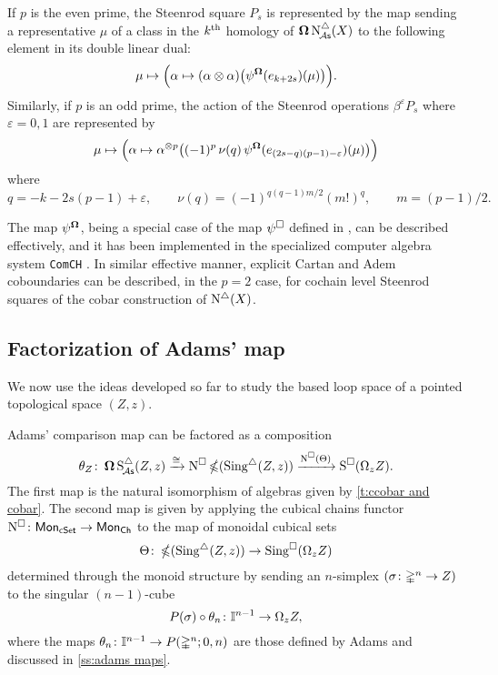 If $p$ is the even prime, the Steenrod square $P_s$ is represented by the map sending a representative $\mu$ of a class in the $k^{\mathrm{th}}$ homology of $\operatorname{\mathbf{\Omega}} \operatorname{N^{\triangle}_{\!{\mathcal{A}\mathsf{s}}}}(X)$ to the following element in its double linear dual:
\[
\mu \mapsto
\Big( \alpha \mapsto (\alpha \otimes \alpha) \big( \psi^{\operatorname{\mathbf{\Omega}}}(e_{k+2s})(\mu) \big) \Big).
\]
Similarly, if $p$ is an odd prime, the action of the Steenrod operations $\beta^\varepsilon P_{s}$ where $\varepsilon = 0,1$ are represented by
\[
\mu \mapsto
\Big( \alpha \mapsto \alpha^{\otimes p} \big( (-1)^p \, \nu(q) \, \psi^{\operatorname{\mathbf{\Omega}}}(e_{(2s-q)(p-1)-\varepsilon})(\mu) \big) \Big)
\]
where
\[
q = -k -2s(p-1) + \varepsilon, \qquad
\nu(q) = (-1)^{q(q-1)m/2}(m!)^q, \qquad
m = (p-1)/2.
\]

The map $\psi^{\operatorname{\mathbf{\Omega}}}$, being a special case of the map $\psi^\square$ defined in \cite{medina2021may_st}, can be described effectively, and it has been implemented in the specialized computer algebra system \texttt{ComCH} \cite{medina2021comch}.
In similar effective manner, explicit Cartan and Adem coboundaries \cite{medina2020cartan, medina2021adem} can be described, in the $p = 2$ case, for cochain level Steenrod squares of the cobar construction of $\operatorname{N^{\triangle}}(X)$.

\subsection{Factorization of Adams' map}\label{ss:factorization of adams}

We now use the ideas developed so far to study the based loop space of a pointed topological space $(Z,z)$.

Adams' comparison map can be factored as a composition
\begin{equation}\label{e:factorization of adams}
	\theta_Z \colon \operatorname{\mathbf{\Omega}} \operatorname{S^{\triangle}_{\!{\mathcal{A}\mathsf{s}}}}(Z,z) \xrightarrow{\cong}
	\operatorname{N^{\square}} \operatorname{\mathbb{\Omega}}(\operatorname{Sing^{\triangle}}(Z,z)) \xrightarrow{\operatorname{N^{\square}}(\Theta)}
	\operatorname{S^{\square}}(\Omega_z Z).
\end{equation}
The first map is the natural isomorphism of algebras given by \cref{t:ccobar and cobar}.
The second map is given by applying the cubical chains functor $\operatorname{N^{\square}} \colon \mathsf{Mon}_{\mathsf{cSet}} \to \mathsf{Mon}_{\mathsf{Ch}}$ to the map of monoidal cubical sets
\[
\Theta \colon \operatorname{\mathbb{\Omega}}(\operatorname{Sing^{\triangle}}(Z,z)) \to \operatorname{Sing^{\square}}(\Omega_z Z)
\]
determined through the monoid structure by sending an $n$-simplex $(\sigma \colon \mathbb{\Delta}^n \to Z)$ to the singular $(n-1)$-cube
\[
P(\sigma) \circ \theta_n \colon \mathbb{I}^{n-1} \to \Omega_z Z,
\]
where the maps $\theta_n \colon \mathbb{I}^{n-1} \to P(\mathbb{\Delta}^n;0,n)$ are those defined by Adams and discussed in \cref{ss:adams maps}.

